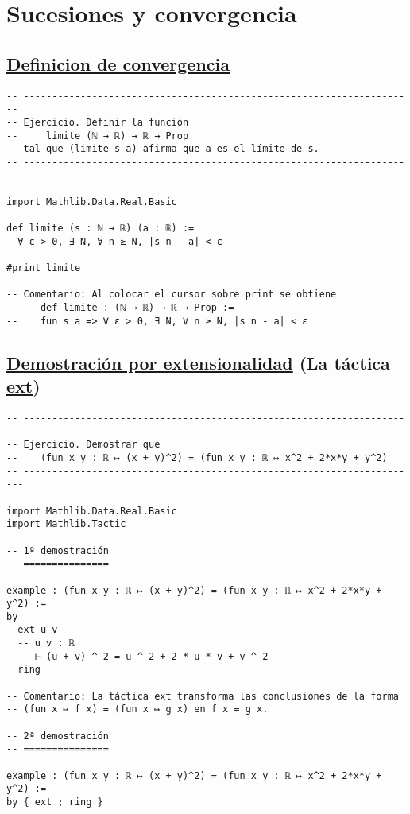 \section{Sucesiones y convergencia}
\label{sec:orgb3b1d70}

\subsection{\href{./src/Logica/Definicion\_de\_convergencia.lean}{Definicion de convergencia}}
\label{sec:org79c9be3}
\begin{verbatim}
-- ---------------------------------------------------------------------
-- Ejercicio. Definir la función
--     limite (ℕ → ℝ) → ℝ → Prop
-- tal que (limite s a) afirma que a es el límite de s.
-- ----------------------------------------------------------------------

import Mathlib.Data.Real.Basic

def limite (s : ℕ → ℝ) (a : ℝ) :=
  ∀ ε > 0, ∃ N, ∀ n ≥ N, |s n - a| < ε

#print limite

-- Comentario: Al colocar el cursor sobre print se obtiene
--    def limite : (ℕ → ℝ) → ℝ → Prop :=
--    fun s a => ∀ ε > 0, ∃ N, ∀ n ≥ N, |s n - a| < ε
\end{verbatim}

\subsection{\href{./src/Logica/Demostracion\_por\_extensionalidad.lean}{Demostración por extensionalidad} (La táctica \href{https://bit.ly/3i5kiW9}{ext})}
\label{sec:org399298a}
\begin{verbatim}
-- ---------------------------------------------------------------------
-- Ejercicio. Demostrar que
--    (fun x y : ℝ ↦ (x + y)^2) = (fun x y : ℝ ↦ x^2 + 2*x*y + y^2)
-- ----------------------------------------------------------------------

import Mathlib.Data.Real.Basic
import Mathlib.Tactic

-- 1ª demostración
-- ===============

example : (fun x y : ℝ ↦ (x + y)^2) = (fun x y : ℝ ↦ x^2 + 2*x*y + y^2) :=
by
  ext u v
  -- u v : ℝ
  -- ⊢ (u + v) ^ 2 = u ^ 2 + 2 * u * v + v ^ 2
  ring

-- Comentario: La táctica ext transforma las conclusiones de la forma
-- (fun x ↦ f x) = (fun x ↦ g x) en f x = g x.

-- 2ª demostración
-- ===============

example : (fun x y : ℝ ↦ (x + y)^2) = (fun x y : ℝ ↦ x^2 + 2*x*y + y^2) :=
by { ext ; ring }
\end{verbatim}

